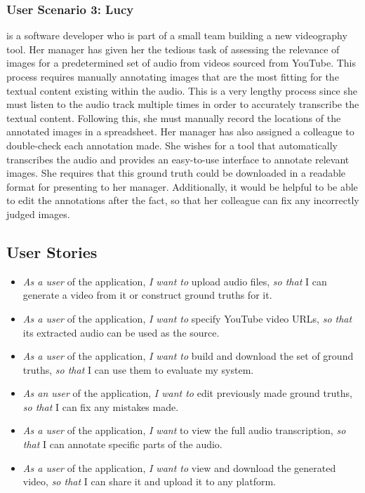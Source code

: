 \documentclass{l4proj}
\begin{document}
\subsubsection{User Scenario 3: Lucy} is a software developer who is part of a small team building a new videography tool. Her manager has given her the tedious task of assessing the relevance of images for a predetermined set of audio from videos sourced from YouTube. This process requires manually annotating images that are the most fitting for the textual content existing within the audio. This is a very lengthy process since she must listen to the audio track multiple times in order to accurately transcribe the textual content. Following this, she must manually record the locations of the annotated images in a spreadsheet. Her manager has also assigned a colleague to double-check each annotation made. She wishes for a tool that automatically transcribes the audio and provides an easy-to-use interface to annotate relevant images. She requires that this ground truth could be downloaded in a readable format for presenting to her manager. Additionally, it would be helpful to be able to edit the annotations after the fact, so that her colleague can fix any incorrectly judged images.


\subsection{User Stories}
\begin{itemize}
    \item \emph{As a user} of the application, \emph{I want to} upload audio files, \emph{so that} I can generate a video from it or construct ground truths for it.
    \item \emph{As a user} of the application, \emph{I want to} specify YouTube video URLs, \emph{so that} its extracted audio can be used as the source.
    \item \emph{As a user} of the application, \emph{I want to} build and download the set of ground truths, \emph{so that} I can use them to evaluate my system.
    \item \emph{As an user} of the application, \emph{I want to} edit previously made ground truths, \emph{so that} I can fix any mistakes made.
    \item \emph{As a user} of the application, \emph{I want} to view the full audio transcription, \emph{so that} I can annotate specific parts of the audio.
    \item \emph{As a user} of the application, \emph{I want to} view and download the generated video, \emph{so that} I can share it and upload it to any platform.
\end{itemize}
\end{document}
